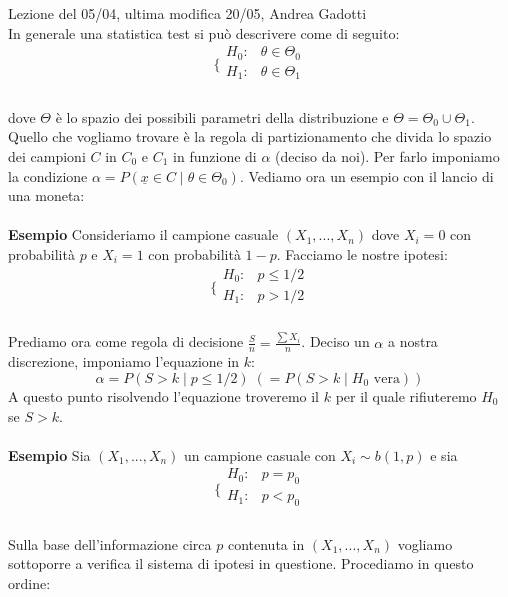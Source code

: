 Lezione del 05/04, ultima modifica 20/05, Andrea Gadotti
\\
In generale una statistica test si può descrivere come di seguito:\\
$$\bigg \{
\begin{array}{rl}
H_0: & \theta \in \Theta_0 \\
H_1: & \theta \in \Theta_1 \\
\end{array}
$$
\\
dove $\Theta$ è lo spazio dei possibili parametri della distribuzione e $\Theta = \Theta_0 \cup \Theta_1$.\\
Quello che vogliamo trovare è la regola di partizionamento che divida lo spazio dei campioni $C$ in $C_0$ e $C_1$ in funzione di $\alpha$ (deciso da noi). Per farlo imponiamo la condizione $\alpha = P(\underline{x} \in C \mid \theta \in \Theta_0)$. Vediamo ora un esempio con il lancio di una moneta:\\
\\
\noindent \textbf{Esempio} Consideriamo il campione casuale $(X_1,...,X_n)$ dove $X_i = 0$ con probabilità $p$ e $X_i = 1$ con probabilità $1-p$. Facciamo le nostre ipotesi:\\
$$\bigg \{
\begin{array}{rl}
H_0: & p \leq 1/2 \\
H_1: & p > 1/2 \\
\end{array}
$$
\\
Prediamo ora come regola di decisione $\frac{S}{n}=\frac{\sum X_i}{n}$. Deciso un $\alpha$ a nostra discrezione, imponiamo l'equazione in $k$:
$$ \alpha = P(S>k \mid p \leq 1/2) \; (= P(S>k \mid H_0 \text{ vera}))$$
A questo punto risolvendo l'equazione troveremo il $k$ per il quale rifiuteremo $H_0$ se $S>k$.\\
\\
\noindent \textbf{Esempio} Sia $(X_1,...,X_n)$ un campione casuale con $X_i \sim b(1,p)$ e sia\\
$$\bigg \{
\begin{array}{rl}
H_0: & p=p_0 \\
H_1: & p<p_0 \\
\end{array}
$$
\\
Sulla base dell'informazione circa $p$ contenuta in $(X_1,...,X_n)$ vogliamo sottoporre a verifica il sistema di ipotesi in questione. Procediamo in questo ordine:\\
